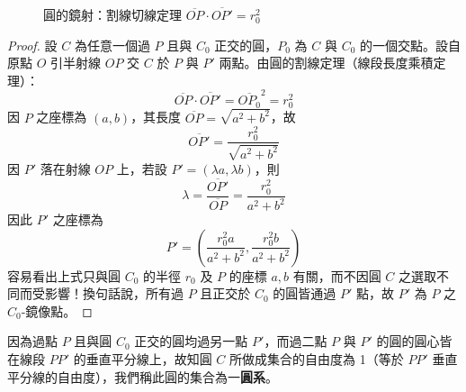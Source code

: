 \begin{figure}[htbp]
\centering
{}
\caption{圓的鏡射：割線切線定理 $\overline{OP} \cdot \overline{OP'} = r_0^2$}
\label{fig:b4s-3-40}
\end{figure}

\begin{proof}
設 $C$ 為任意一個過 $P$ 且與 $C_0$ 正交的圓，$P_0$ 為 $C$ 與 $C_0$ 的一個交點。設自原點 $O$ 引半射線 $OP$ 交 $C$ 於 $P$ 與 $P'$ 兩點。由圓的割線定理（線段長度乘積定理）：
\[ \overline{OP} \cdot \overline{OP'} = \overline{OP_0}^2 = r_0^2 \]
因 $P$ 之座標為 $(a,b)$，其長度 $\overline{OP} = \sqrt{a^2 + b^2}$，故
\[ \overline{OP'} = \frac{r_0^2}{\sqrt{a^2 + b^2}} \]
因 $P'$ 落在射線 $OP$ 上，若設 $P' = (\lambda a, \lambda b)$，則
\[ \lambda = \frac{\overline{OP'}}{\overline{OP}} = \frac{r_0^2}{a^2 + b^2} \]
因此 $P'$ 之座標為
\[ P' = \left(\frac{r_0^2 a}{a^2 + b^2}, \frac{r_0^2 b}{a^2 + b^2}\right) \]
容易看出上式只與圓 $C_0$ 的半徑 $r_0$ 及 $P$ 的座標 $a, b$ 有關，而不因圓 $C$ 之選取不同而受影響！換句話說，所有過 $P$ 且正交於 $C_0$ 的圓皆通過 $P'$ 點，故 $P'$ 為 $P$ 之 $C_0$-鏡像點。
\end{proof}

因為過點 $P$ 且與圓 $C_0$ 正交的圓均過另一點 $P'$，而過二點 $P$ 與 $P'$ 的圓的圓心皆在線段 $PP'$ 的垂直平分線上，故知圓 $C$ 所做成集合的自由度為 1（等於 $PP'$ 垂直平分線的自由度），我們稱此圓的集合為一\textbf{圓系}。

